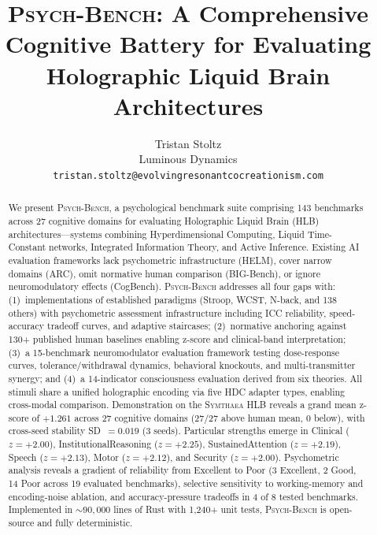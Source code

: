\documentclass[11pt,letterpaper]{article}
\newcommand{\symthaea}{\textsc{Symthaea}}
\newcommand{\psychbench}{\textsc{Psych-Bench}}
\newcommand{\hlb}{\textsc{HLB}}
\begin{document}
\title{\psychbench{}: A Comprehensive Cognitive Battery for Evaluating\\
Holographic Liquid Brain Architectures}

\author{Tristan Stoltz\\
Luminous Dynamics\\
\texttt{tristan.stoltz@evolvingresonantcocreationism.com}}

\date{}
\maketitle

\begin{abstract}
\noindent
We present \psychbench{}, a psychological benchmark suite comprising 143 benchmarks across 27 cognitive domains for evaluating Holographic Liquid Brain (\hlb{}) architectures---systems combining Hyperdimensional Computing, Liquid Time-Constant networks, Integrated Information Theory, and Active Inference. Existing AI evaluation frameworks lack psychometric infrastructure (HELM), cover narrow domains (ARC), omit normative human comparison (BIG-Bench), or ignore neuromodulatory effects (CogBench). \psychbench{} addresses all four gaps with: (1)~implementations of established paradigms (Stroop, WCST, N-back, and 138 others) with psychometric assessment infrastructure including ICC reliability, speed-accuracy tradeoff curves, and adaptive staircases; (2)~normative anchoring against 130+ published human baselines enabling z-score and clinical-band interpretation; (3)~a 15-benchmark neuromodulator evaluation framework testing dose-response curves, tolerance/withdrawal dynamics, behavioral knockouts, and multi-transmitter synergy; and (4)~a 14-indicator consciousness evaluation derived from six theories. All stimuli share a unified holographic encoding via five HDC adapter types, enabling cross-modal comparison. Demonstration on the \symthaea{} \hlb{} reveals a grand mean z-score of $+1.261$ across 27 cognitive domains (27/27 above human mean, 0 below), with cross-seed stability SD~$= 0.019$ (3 seeds). Particular strengths emerge in Clinical ($z = +2.00$), InstitutionalReasoning ($z = +2.25$), SustainedAttention ($z = +2.19$), Speech ($z = +2.13$), Motor ($z = +2.12$), and Security ($z = +2.00$). Psychometric analysis reveals a gradient of reliability from Excellent to Poor (3 Excellent, 2 Good, 14 Poor across 19 evaluated benchmarks), selective sensitivity to working-memory and encoding-noise ablation, and accuracy-pressure tradeoffs in 4 of 8 tested benchmarks. Implemented in ${\sim}90{,}000$ lines of Rust with 1,240+ unit tests, \psychbench{} is open-source and fully deterministic.
\end{abstract}
\end{document}
